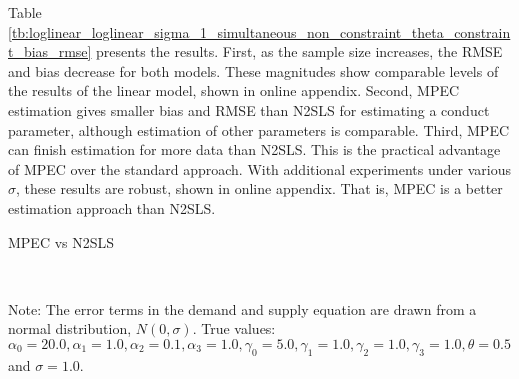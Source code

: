 \documentclass[11pt, a4paper]{article}
\begin{document}
Table \ref{tb:loglinear_loglinear_sigma_1_simultaneous_non_constraint_theta_constraint_bias_rmse} presents the results.
First, as the sample size increases, the RMSE and bias decrease for both models. 
These magnitudes show comparable levels of the results of the linear model, shown in online appendix. 
Second, MPEC estimation gives smaller bias and RMSE than N2SLS for estimating a conduct parameter, although estimation of other parameters is comparable.
Third, MPEC can finish estimation for more data than N2SLS. 
This is the practical advantage of MPEC over the standard approach. 
With additional experiments under various $\sigma$, these results are robust, shown in online appendix. 
That is, MPEC is a better estimation approach than N2SLS.

\begin{table}[!htbp]
  \begin{center}
      \caption{MPEC vs N2SLS}
      \label{tb:loglinear_loglinear_sigma_1_simultaneous_non_constraint_theta_constraint_bias_rmse} 
      \subfloat[MPEC]{}\\
    \subfloat[N2SLS]{}
  \end{center}
  \footnotesize
  Note: The error terms in the demand and supply equation are drawn from a normal distribution, $N(0, \sigma)$. True values: $\alpha_0=20.0,\alpha_1=1.0,\alpha_2=0.1,\alpha_3=1.0,\gamma_0=5.0,\gamma_1=1.0,\gamma_2=1.0,\gamma_3=1.0,\theta=0.5$ and $\sigma=1.0$.
\end{table} 
\end{document}
